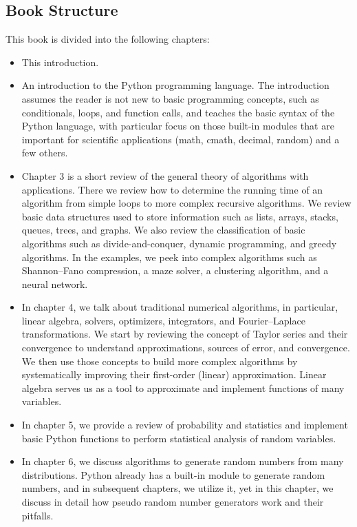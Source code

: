 \documentclass[justified, sixbynine]{tufte-book}
\theoremstyle{plain}%
\newtheorem * {corollary}{Corollary}
\theoremstyle{definition}
\theoremstyle{remark}
\newtheorem * {remark}{Remark}
\newtheorem * {note}{Note}
\begin{document}
\begin{fullwidth}
\section{Book Structure}

This book is divided into the following chapters:

\begin{itemize}
\item This introduction.
\item An introduction to the Python programming language. The introduction assumes the reader is not new to basic programming concepts, such as conditionals, loops, and function calls, and teaches the basic syntax of the Python language, with particular focus on those built-in modules that are important for scientific applications (math, cmath, decimal, random) and a few others.
\item Chapter 3 is a short review of the general theory of algorithms with applications. There we review how to determine the running time of an algorithm from simple loops to more complex recursive algorithms. We review basic data structures used to store information such as lists, arrays, stacks, queues, trees, and graphs. We also review the classification of basic algorithms such as divide-and-conquer, dynamic programming, and greedy algorithms. In the examples, we peek into complex algorithms such as Shannon--Fano compression, a maze solver, a clustering algorithm, and a neural network.
\item In chapter 4, we talk about traditional numerical algorithms, in particular, linear algebra, solvers, optimizers, integrators, and Fourier--Laplace transformations. We start by reviewing the concept of Taylor series and their convergence to understand approximations, sources of error, and convergence. We then use those concepts to build more complex algorithms by systematically improving their first-order (linear) approximation. Linear algebra serves us as a tool to approximate and implement functions of many variables.
\item In chapter 5, we provide a review of probability and statistics and implement basic Python functions to perform statistical analysis of random variables.
\item In chapter 6, we discuss algorithms to generate random numbers from many distributions. Python already has a built-in module to generate random numbers, and in subsequent chapters, we utilize it, yet in this chapter, we discuss in detail how pseudo random number generators work and their pitfalls.

\end{itemize}
\end{fullwidth}
\end{document}
